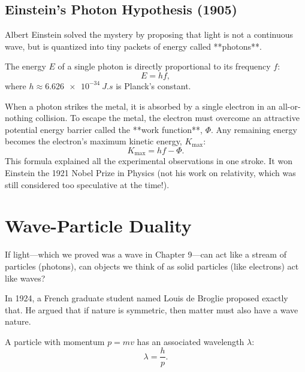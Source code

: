\subsection{Einstein's Photon Hypothesis (1905)}

Albert Einstein solved the mystery by proposing that light is not a continuous wave, but is quantized into tiny packets of energy called **photons**. 

\begin{keybox}
The energy $E$ of a single photon is directly proportional to its frequency $f$:
\begin{equation}
    E = h f,
\end{equation}
where $h \approx \SI{6.626e-34}{J.s}$ is Planck's constant.
\end{keybox}

When a photon strikes the metal, it is absorbed by a single electron in an all-or-nothing collision. To escape the metal, the electron must overcome an attractive potential energy barrier called the **work function**, $\Phi$. Any remaining energy becomes the electron's maximum kinetic energy, $K_{\text{max}}$:
\begin{equation}
    K_{\text{max}} = h f - \Phi.
\end{equation}
This formula explained all the experimental observations in one stroke. It won Einstein the 1921 Nobel Prize in Physics (not his work on relativity, which was still considered too speculative at the time!).

\section{Wave-Particle Duality}

If light—which we proved was a wave in Chapter 9—can act like a stream of particles (photons), can objects we think of as solid particles (like electrons) act like waves?

In 1924, a French graduate student named Louis de Broglie proposed exactly that. He argued that if nature is symmetric, then matter must also have a wave nature.

\begin{keybox}
A particle with momentum $p = mv$ has an associated wavelength $\lambda$:
\begin{equation}
    \lambda = \frac{h}{p}.
\end{equation}
\end{keybox}

